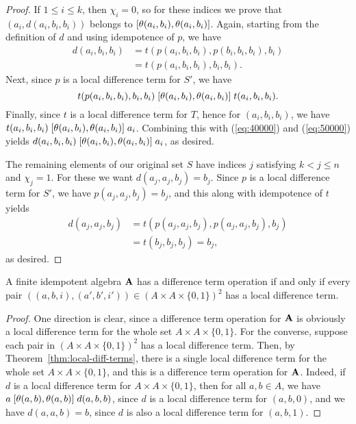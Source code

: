 \begin{proof}
If $1\leq i \leq k$, then $\chi_i =0$, so for these indices we prove
that $(a_i, d(a_i,b_i,b_i))$ belongs to $\mathrel{[\theta(a_i,b_i), \theta(a_i,b_i)]}$.
Again, starting from the definition of $d$ and using idempotence of $p$, we have
\begin{align}
  d(a_i,b_i,b_i) &=
  t(p(a_i,b_i,b_i), p(b_i,b_i,b_i), b_i)   \label{eq:40000}\\
  &=t(p(a_i,b_i,b_i), b_i, b_i). \nonumber
\end{align}
Next, since $p$ is a local difference term for $S'$, we have
\begin{equation}
  \label{eq:50000}
  t(p(a_i,b_i,b_i), b_i, b_i)
 \mathrel{[\theta(a_i,b_i), \theta(a_i,b_i)]}
 t(a_i, b_i, b_i).
\end{equation}
Finally, since $t$ is a local difference term for $T$, hence for
$(a_i, b_i, b_i)$,  %
we have 
$t(a_i, b_i, b_i) \mathrel{[\theta(a_i,b_i), \theta(a_i,b_i)]} a_i$.
Combining this with (\ref{eq:40000}) and (\ref{eq:50000}) yields
$d(a_i,b_i,b_i) \mathrel{[\theta(a_i,b_i), \theta(a_i,b_i)]} a_i$,
as desired.

The remaining elements of our original set $S$
have indices $j$ satisfying $k<j\leq n$ and $\chi_j = 1$.
For these we want $d(a_j,a_j,b_j) = b_j$.
Since $p$ is a local difference term for $S'$, we have
$p(a_j,a_j,b_j) = b_j$, and this along with idempotence of $t$ yields
\begin{align*}
d(a_j,a_j,b_j) &=
t(p(a_j,a_j,b_j), p(a_j,a_j,b_j), b_j)\\
&=t(b_j, b_j, b_j) =b_j,
\end{align*}
as desired.
\end{proof}

\begin{cor}
  \label{cor:loc-diff-term}
  A finite idempotent algebra $\mathbf{A}$ has a difference term operation if and
  only if every pair $((a,b,i), (a',b',i')) \in (A\times A \times \{0,1\})^2$ has a local
  difference term.
\end{cor}
\begin{proof}
  One direction is clear, since a difference term operation for $\mathbf{A}$ is
  obviously a local difference term for the whole set 
  $A\times A \times \{0,1\}$.
  For the converse, suppose
  each pair in $(A\times A \times \{0,1\})^2$ has a local
  difference term. Then, by Theorem~\ref{thm:local-diff-terms},
  there is a single local difference term for the whole set $A\times A \times \{0,1\}$,
  and this is a difference term operation for $\mathbf{A}$.  Indeed, if $d$ is a
  local difference term for $A\times A \times \{0,1\}$, then 
  for all $a, b \in A$, we have
  $a \mathrel{[\theta(a,b), \theta(a,b)]} d(a,b,b)$,
  since $d$ is a local difference term for $(a,b,0)$, and we have
  $d(a,a,b) = b$, since $d$ is also a local difference term for
  $(a,b,1)$.
\end{proof}

